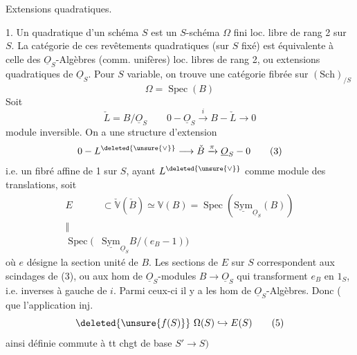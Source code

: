 Extensions quadratiques.

1. Un  quadratique d'un schéma $S$ est un
$S$-schéma $\Omega$ fini loc. libre de rang 2 sur $S$. La catégorie
de ces revêtements quadratiques (sur $S$ fixé) est
équivalente à celle des $\underline{O}_S$-Algèbres (comm. unifères)
 loc. libres de rang 2, ou  extensions quadratiques
de $\underline{O}_S$. Pour $S$ variable, on trouve une catégorie
fibrée sur $(\mathrm{Sch})_{/S}$
\[
\Omega=\operatorname{Spec}(B) \tag*{(1)}
\]
Soit 
\[
\check L=B/\underline{O}_S\qquad 0\mathbin{-}\underline{O}_S\xrightarrow{i}B\mathbin{-}\check L\longrightarrow0 \tag*{(2)}
\]
module inversible. On a une structure d'extension
\[
0\mathbin{-}L^{\deleted{\unsure{\vee}}}\longrightarrow\check B\xrightarrow{\pi}\underline{O}_S\mathbin{-}0 \tag*{(3)}
\]
i.e. un fibré affine de  1 sur $S$, ayant
$L^{\deleted{\unsure{\vee}}}$ comme module des translations, 
soit
\[
\begin{aligned}
 E&\subset\check{\mathbb V}(\check B)\simeq\mathbb V(B)=\operatorname{Spec}(\underline{\mathrm{Sym}}_{\underline{O}_S}(B))\\
 \Vert&\\[-3pt]
 \operatorname{Spec}(&\underline{\mathrm{Sym}}_{\underline{O}_S} B/(e_B-1))
\end{aligned} \tag*{(4)}
\]
où $e$ désigne la section unité de $B$. Les sections de
$E$ sur $S$ correspondent aux scindages de (3), ou
aux hom de $\underline{O}_S$-modules $B\longrightarrow\underline{O}_S$ qui
transforment $e_B$ en $1_S$, i.e. inverses à gauche de $i$.
Parmi ceux-ci il y a les  hom de
$\underline{O}_S$-Algèbres. Donc ( que l'application inj.
\[
\deleted{\unsure{f(S)}}\ \Omega(S)\hookrightarrow E(S) \tag*{(5)}
\]
ainsi définie commute à tt chgt de base $S'\longrightarrow S)$


